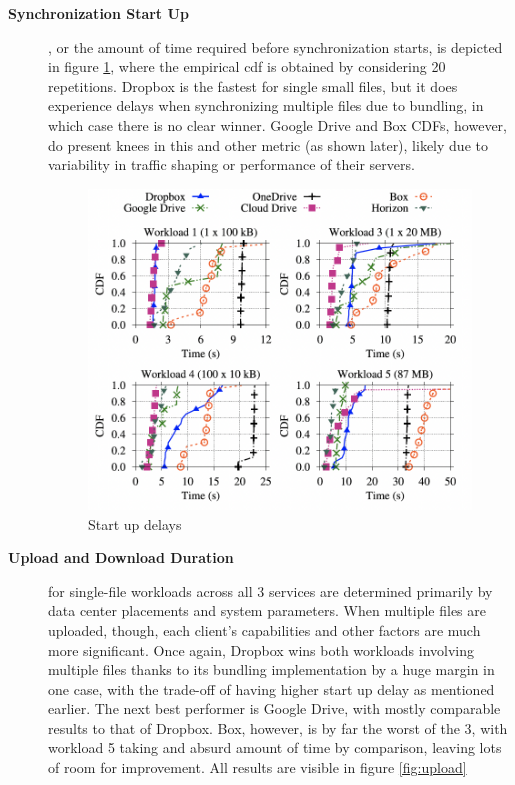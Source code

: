 \begin{description}
    \item[\textbf{Synchronization Start Up}], or the amount of time required before synchronization starts, is depicted in figure \ref{fig:synchronization start up}, where the empirical \ac{cdf} is obtained by considering 20 repetitions. Dropbox is the fastest for single small files, but it does experience delays when synchronizing multiple files due to bundling, in which case there is no clear winner. Google Drive and Box CDFs, however, do present knees in this and other metric (as shown later), likely due to variability in traffic shaping or performance of their servers.

    \begin{figure} [h]
        \centering
        \includegraphics[scale=0.7]{images/start_up_delay}
        \caption{\label{fig:synchronization start up}Start up delays}
    \end{figure}

    \item[\textbf{Upload and Download Duration}] for single-file workloads across all 3 services are determined primarily by data center placements and system parameters. When multiple files are uploaded, though, each client's capabilities and other factors are much more significant. Once again, Dropbox wins both workloads involving multiple files thanks to its bundling implementation by a huge margin in one case, with the trade-off of having higher start up delay as mentioned earlier. The next best performer is Google Drive, with mostly comparable results to that of Dropbox. Box, however, is by far the worst of the 3, with workload 5 taking and absurd amount of time by comparison, leaving lots of room for improvement. All results are visible in figure  \ref{fig:upload}


\end{description}
